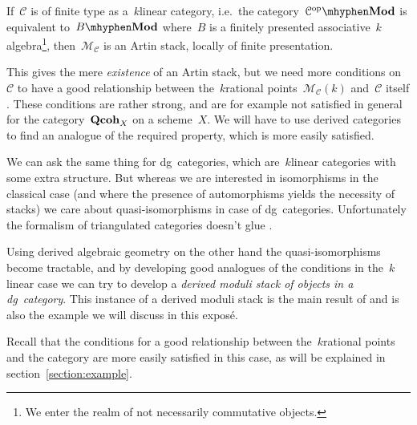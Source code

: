 \begin{refsection}
\begin{example}
  If~$\mathcal{C}$ is of finite type as a~$k$\dash linear category, i.e.\ the category~$\mathcal{C}^\opp\mhyphen\Mod$ is equivalent to~$B\mhyphen\Mod$ where~$B$ is a finitely presented associative~$k$\dash algebra\footnote{We enter the realm of not necessarily commutative objects.}, then~$\mathcal{M}_{\mathcal{C}}$ is an Artin stack, locally of finite presentation.

  This gives the mere \emph{existence} of an Artin stack, but we need more conditions on~$\mathcal{C}$ to have a good relationship between the~$k$\dash rational points~$\mathcal{M}_{\mathcal{C}}(k)$ and~$\mathcal{C}$ itself \cite[remark 1.2]{toen-vaquie}. These conditions are rather strong, and are for example not satisfied in general for the category~$\mathbf{Qcoh}_X$ on a scheme~$X$. We will have to use derived categories to find an analogue of the required property, which is more easily satisfied.
\end{example}

\begin{remark}
  We can ask the same thing for dg~categories, which are~$k$\dash linear categories with some extra structure. But whereas we are interested in isomorphisms in the classical case (and where the presence of automorphisms yields the necessity of stacks) we care about quasi-isomorphisms in case of dg~categories. Unfortunately the formalism of triangulated categories doesn't glue \cite[example 4 in section 2.2]{lnm2008-toen}.

  Using derived algebraic geometry on the other hand the quasi-isomorphisms become tractable, and by developing good analogues of the conditions in the~$k$\dash linear case we can try to develop a \emph{derived moduli stack of objects in a dg~category}. This instance of a derived moduli stack is the main result of \cite{toen-vaquie} and is also the example we will discuss in this expos\'e.
  
  Recall that the conditions for a good relationship between the~$k$\dash rational points and the category are more easily satisfied in this case, as will be explained in section~\ref{section:example}.
\end{remark}


\end{refsection}

